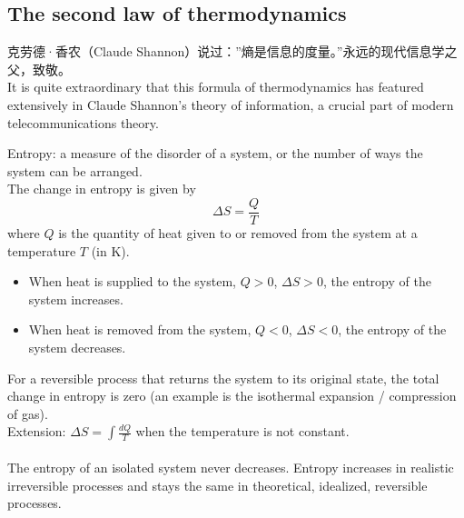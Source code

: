\documentclass[a4paper,12pt]{article}
\begin{document}
\subsection{The second law of thermodynamics}
克劳德·香农（Claude Shannon）说过：”熵是信息的度量。”永远的现代信息学之父，致敬。\\
It is quite extraordinary that this formula of thermodynamics has featured extensively in Claude Shannon's theory of information, a crucial part of modern telecommunications theory.

Entropy: a measure of the disorder of a system, or the number of ways the system can be arranged.\\
The change in entropy is given by
\[\Delta S = \dfrac{Q}{T}\]
where $Q$ is the quantity of heat given to or removed from the system at a temperature $T$ (in K).\\
\begin{itemize}
  \item When heat is supplied to the system, $Q>0$, $\Delta S>0$, the entropy of the system increases.
  \item When heat is removed from the system, $Q<0$, $\Delta S<0$, the entropy of the system decreases.
\end{itemize} 
For a reversible process that returns the system to its original state, the total change in entropy is zero (an example is the isothermal expansion / compression of gas).\\
Extension: \(\displaystyle \Delta S = \int \frac{dQ}{T}\) when the temperature is not constant.\\\\
The entropy of an isolated system never decreases. Entropy increases in realistic irreversible processes and stays the same in theoretical, idealized, reversible processes.
\end{document}
